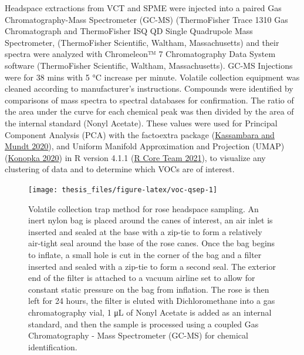 \documentclass[12pt,final,CPage]{ufthesis}
\renewcommand{\hypertarget}[2]{\leavevmode\oldhypertarget{#1}{#2}}
\begin{document}
{  \hypertarget{mm-voc-analyze}{%
  \subsubsection{Analysis of headspace data}\label{mm-voc-analyze}}

  Headspace extractions from VCT and SPME were injected into a paired Gas Chromatography-Mass Spectrometer (GC-MS) (ThermoFisher Trace 1310 Gas Chromatograph and ThermoFisher ISQ QD Single Quadrupole Mass Spectrometer, (ThermoFisher Scientific, Waltham, Massachusetts) and their spectra were analyzed with Chromeleon™ 7 Chromatography Data System software (ThermoFisher Scientific, Waltham, Massachusetts). GC-MS Injections were for 38 mins with 5 °C increase per minute. Volatile collection equipment was cleaned according to manufacturer's instructions. Compounds were identified by comparisons of mass spectra to spectral databases for confirmation. The ratio of the area under the curve for each chemical peak was then divided by the area of the internal standard (Nonyl Acetate). These values were used for Principal Component Analysis (PCA) with the factoextra package (\protect\hyperlink{ref-Kassambara2020a}{Kassambara and Mundt 2020}), and Uniform Manifold Approximation and Projection (UMAP) (\protect\hyperlink{ref-Konopka2020a}{Konopka 2020}) in R version 4.1.1 (\protect\hyperlink{ref-RCT2021}{R Core Team 2021}), to visualize any clustering of data and to determine which VOCs are of interest.
  \begin{figure}

  {\centering \texttt{[image: thesis\_files/figure-latex/voc-qsep-1]} 

  }

  \caption[Volatile collection trap method for rose headspace sampling]{Volatile collection trap method for rose headspace sampling. An inert nylon bag is placed around the canes of interest, an air inlet is inserted and sealed at the base with a zip-tie to form a relatively air-tight seal around the base of the rose canes. Once the bag begins to inflate, a small hole is cut in the corner of the bag and a filter inserted and sealed with a zip-tie to form a second seal. The exterior end of the filter is attached to a vacuum airline set to allow for constant static pressure on the bag from inflation. The rose is then left for 24 hours, the filter is eluted with Dichloromethane into a gas chromatography vial, 1 \si{\micro\liter} of Nonyl Acetate is added as an internal standard, and then the sample is processed using a coupled Gas Chromatography - Mass Spectrometer (GC-MS) for chemical identification.}\label{fig:voc-qsep}
  \end{figure}
  \begin{figure}


\end{figure}}
\end{document}
